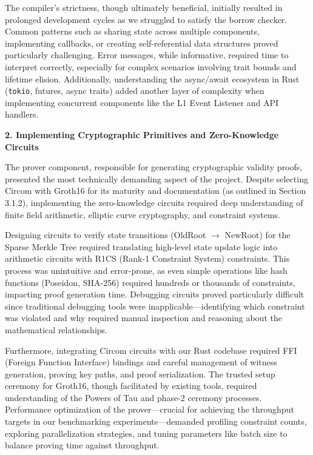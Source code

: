 The compiler's strictness, though ultimately beneficial, initially resulted in prolonged development cycles as we struggled to satisfy the borrow checker. Common patterns such as sharing state across multiple components, implementing callbacks, or creating self-referential data structures proved particularly challenging. Error messages, while informative, required time to interpret correctly, especially for complex scenarios involving trait bounds and lifetime elision. Additionally, understanding the async/await ecosystem in Rust (\texttt{tokio}, futures, async traits) added another layer of complexity when implementing concurrent components like the L1 Event Listener and API handlers.

\textbf{2. Implementing Cryptographic Primitives and Zero-Knowledge Circuits}

The prover component, responsible for generating cryptographic validity proofs, presented the most technically demanding aspect of the project. Despite selecting Circom with Groth16 for its maturity and documentation (as outlined in Section 3.1.2), implementing the zero-knowledge circuits required deep understanding of finite field arithmetic, elliptic curve cryptography, and constraint systems.

Designing circuits to verify state transitions (OldRoot $\rightarrow$ NewRoot) for the Sparse Merkle Tree required translating high-level state update logic into arithmetic circuits with R1CS (Rank-1 Constraint System) constraints. This process was unintuitive and error-prone, as even simple operations like hash functions (Poseidon, SHA-256) required hundreds or thousands of constraints, impacting proof generation time. Debugging circuits proved particularly difficult since traditional debugging tools were inapplicable—identifying which constraint was violated and why required manual inspection and reasoning about the mathematical relationships.

Furthermore, integrating Circom circuits with our Rust codebase required FFI (Foreign Function Interface) bindings and careful management of witness generation, proving key paths, and proof serialization. The trusted setup ceremony for Groth16, though facilitated by existing tools, required understanding of the Powers of Tau and phase-2 ceremony processes. Performance optimization of the prover—crucial for achieving the throughput targets in our benchmarking experiments—demanded profiling constraint counts, exploring parallelization strategies, and tuning parameters like batch size to balance proving time against throughput.

